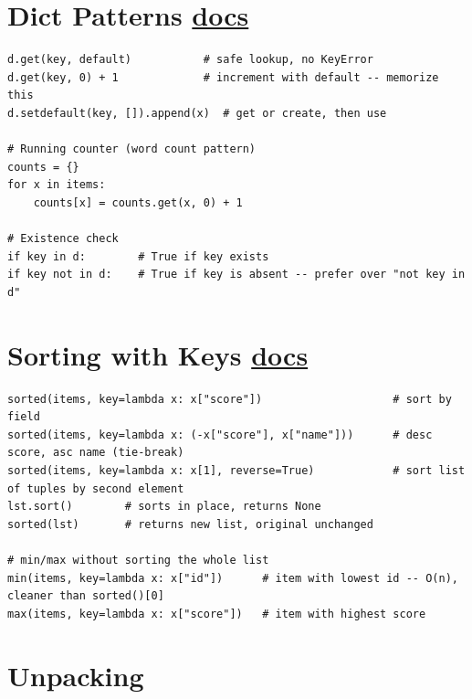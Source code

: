 \documentclass[10pt,letterpaper]{article}
\begin{document}
\vspace{4pt}

\section{Dict Patterns \normalfont\small\href{https://docs.python.org/3/library/stdtypes.html#mapping-types-dict}{docs}}

\begin{lstlisting}
d.get(key, default)           # safe lookup, no KeyError
d.get(key, 0) + 1             # increment with default -- memorize this
d.setdefault(key, []).append(x)  # get or create, then use

# Running counter (word count pattern)
counts = {}
for x in items:
    counts[x] = counts.get(x, 0) + 1

# Existence check
if key in d:        # True if key exists
if key not in d:    # True if key is absent -- prefer over "not key in d"
\end{lstlisting}

\section{Sorting with Keys \normalfont\small\href{https://docs.python.org/3/library/functions.html#sorted}{docs}}

\begin{lstlisting}
sorted(items, key=lambda x: x["score"])                    # sort by field
sorted(items, key=lambda x: (-x["score"], x["name"]))      # desc score, asc name (tie-break)
sorted(items, key=lambda x: x[1], reverse=True)            # sort list of tuples by second element
lst.sort()        # sorts in place, returns None
sorted(lst)       # returns new list, original unchanged

# min/max without sorting the whole list
min(items, key=lambda x: x["id"])      # item with lowest id -- O(n), cleaner than sorted()[0]
max(items, key=lambda x: x["score"])   # item with highest score
\end{lstlisting}

\section{Unpacking}
\end{document}
